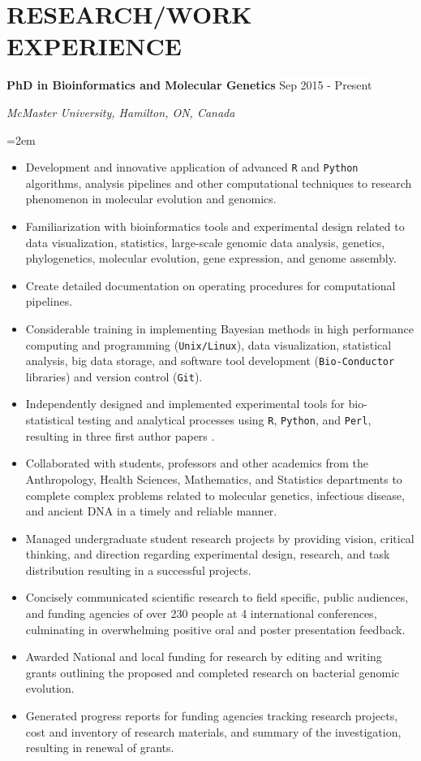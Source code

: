\documentclass[paper=a4,fontsize=11pt]{scrartcl}	 			%
\newcommand{\NewPart}[1]{\section*{\uppercase{#1}}}
\newcommand{\EducationEntry}[4]{
		\noindent \textbf{#1} \hfill 					%
		\colorbox{White}{%
			\parbox{10em}{%
			\hfill\color{Black}#2}} \par				%
		\noindent \textit{#3} \par					%
		\noindent\hangindent=2em\hangafter=0 \small #4 	%
		\normalsize \par}
\newcommand{\WorkEntry}[4]{						%
		\noindent \textbf{#1} \hfill 					%
		\colorbox{White}{\color{Black}#2} \par		%
		\noindent \textit{#3} \par					%
		\noindent\hangindent=2em\hangafter=0 \small #4 	%
		\normalsize \par}
\begin{document}
\NewPart{Research/Work Experience}{}
\WorkEntry{PhD in Bioinformatics and Molecular Genetics}{Sep 2015 - Present}{McMaster University, Hamilton, ON, Canada}{
	\begin{itemize}
		\item Development and innovative application of advanced \texttt{R} and \texttt{Python} algorithms, analysis pipelines and other computational techniques to research phenomenon in molecular evolution and genomics.
		\item Familiarization with bioinformatics tools and experimental design related to data visualization, statistics, large-scale genomic data analysis, genetics, phylogenetics, molecular evolution, gene expression, and genome assembly.
		\item Create detailed documentation on operating procedures for computational pipelines.
		\item Considerable training in implementing Bayesian methods in high performance computing and programming (\texttt{Unix/Linux}), data visualization, statistical analysis, big data storage, and software tool development (\texttt{Bio-Conductor} libraries) and version control (\texttt{Git}).
		\item Independently designed and implemented experimental tools for bio-statistical testing and analytical processes using \texttt{R}, \texttt{Python}, and \texttt{Perl}, resulting in three first author papers \cite{LatoD:20,Lat:20,Lato:20}.
		\item Collaborated with students, professors and other academics from the Anthropology, Health Sciences, Mathematics, and Statistics departments to complete complex problems related to molecular genetics, infectious disease, and ancient DNA in a timely and reliable manner. 
		\item Managed undergraduate student research projects by providing vision, critical thinking, and direction regarding experimental design, research, and task distribution resulting in a successful projects.
		\item Concisely communicated scientific research to field specific, public audiences, and funding agencies of over 230 people at 4 international conferences, culminating in overwhelming positive oral and poster presentation feedback.
		\item Awarded National and local funding for research by editing and writing grants outlining the proposed and completed research on bacterial genomic evolution.
		\item Generated progress reports for funding agencies tracking research projects, cost and inventory of research materials, and summary of the investigation, resulting in renewal of grants.
\end{itemize}}
\end{document}
